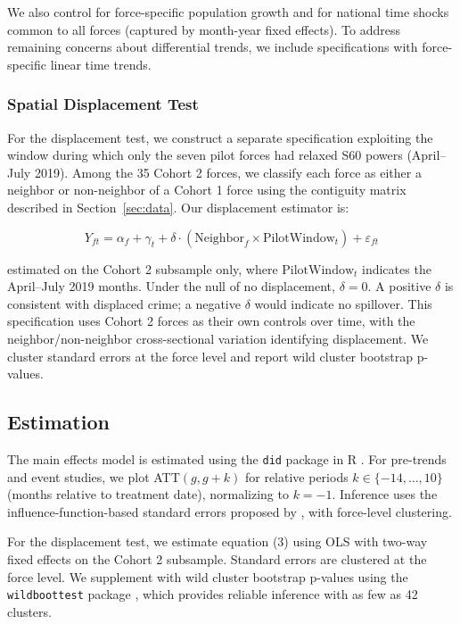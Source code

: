 \documentclass[12pt]{article}
\begin{document}
We also control for force-specific population growth and for national time shocks common to all forces (captured by month-year fixed effects). To address remaining concerns about differential trends, we include specifications with force-specific linear time trends.

\subsubsection*{Spatial Displacement Test}

For the displacement test, we construct a separate specification exploiting the window during which only the seven pilot forces had relaxed S60 powers (April--July 2019). Among the 35 Cohort 2 forces, we classify each force as either a neighbor or non-neighbor of a Cohort 1 force using the contiguity matrix described in Section~\ref{sec:data}. Our displacement estimator is:

\begin{equation}
Y_{ft} = \alpha_f + \gamma_t + \delta \cdot (\text{Neighbor}_f \times \text{PilotWindow}_t) + \varepsilon_{ft}
\end{equation}

estimated on the Cohort 2 subsample only, where $\text{PilotWindow}_t$ indicates the April--July 2019 months. Under the null of no displacement, $\delta = 0$. A positive $\delta$ is consistent with displaced crime; a negative $\delta$ would indicate no spillover. This specification uses Cohort 2 forces as their own controls over time, with the neighbor/non-neighbor cross-sectional variation identifying displacement. We cluster standard errors at the force level and report wild cluster bootstrap p-values.

\subsection{Estimation}

The main effects model is estimated using the \texttt{did} package in R \citep{callaway2021r}. For pre-trends and event studies, we plot ATT$(g, g+k)$ for relative periods $k \in \{-14, \ldots, 10\}$ (months relative to treatment date), normalizing to $k = -1$. Inference uses the influence-function-based standard errors proposed by \citet{callaway2021}, with force-level clustering.

For the displacement test, we estimate equation (3) using OLS with two-way fixed effects on the Cohort 2 subsample. Standard errors are clustered at the force level. We supplement with wild cluster bootstrap p-values using the \texttt{wildboottest} package \citep{roodman2019}, which provides reliable inference with as few as 42 clusters.
\end{document}
